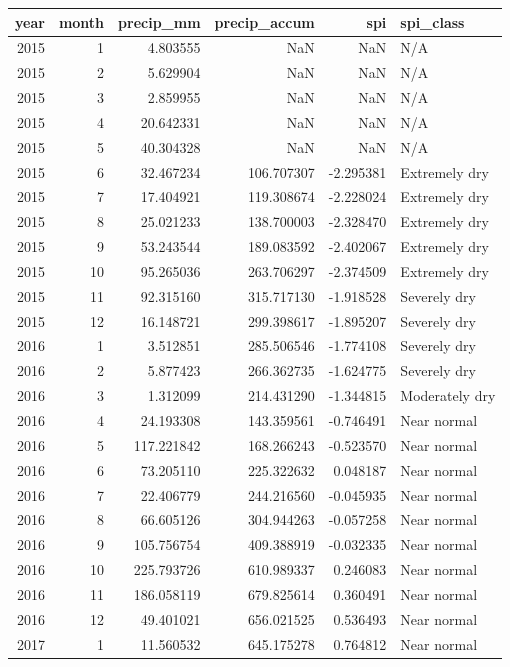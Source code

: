 \begin{tabular}{rrrrrl}
\toprule
year & month & precip\_mm & precip\_accum & spi & spi\_class \\
\midrule
2015 & 1 & 4.803555 & NaN & NaN & N/A \\
2015 & 2 & 5.629904 & NaN & NaN & N/A \\
2015 & 3 & 2.859955 & NaN & NaN & N/A \\
2015 & 4 & 20.642331 & NaN & NaN & N/A \\
2015 & 5 & 40.304328 & NaN & NaN & N/A \\
2015 & 6 & 32.467234 & 106.707307 & -2.295381 & Extremely dry \\
2015 & 7 & 17.404921 & 119.308674 & -2.228024 & Extremely dry \\
2015 & 8 & 25.021233 & 138.700003 & -2.328470 & Extremely dry \\
2015 & 9 & 53.243544 & 189.083592 & -2.402067 & Extremely dry \\
2015 & 10 & 95.265036 & 263.706297 & -2.374509 & Extremely dry \\
2015 & 11 & 92.315160 & 315.717130 & -1.918528 & Severely dry \\
2015 & 12 & 16.148721 & 299.398617 & -1.895207 & Severely dry \\
2016 & 1 & 3.512851 & 285.506546 & -1.774108 & Severely dry \\
2016 & 2 & 5.877423 & 266.362735 & -1.624775 & Severely dry \\
2016 & 3 & 1.312099 & 214.431290 & -1.344815 & Moderately dry \\
2016 & 4 & 24.193308 & 143.359561 & -0.746491 & Near normal \\
2016 & 5 & 117.221842 & 168.266243 & -0.523570 & Near normal \\
2016 & 6 & 73.205110 & 225.322632 & 0.048187 & Near normal \\
2016 & 7 & 22.406779 & 244.216560 & -0.045935 & Near normal \\
2016 & 8 & 66.605126 & 304.944263 & -0.057258 & Near normal \\
2016 & 9 & 105.756754 & 409.388919 & -0.032335 & Near normal \\
2016 & 10 & 225.793726 & 610.989337 & 0.246083 & Near normal \\
2016 & 11 & 186.058119 & 679.825614 & 0.360491 & Near normal \\
2016 & 12 & 49.401021 & 656.021525 & 0.536493 & Near normal \\
2017 & 1 & 11.560532 & 645.175278 & 0.764812 & Near normal \\

\end{tabular}
